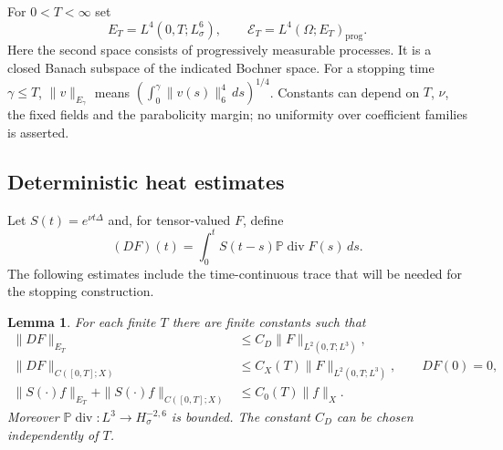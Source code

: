 \documentclass[11pt]{article}
\newcommand{\Pp}{\mathbb P}
\newtheorem{lemma}[theorem]{Lemma}
\numberwithin{equation}{section}
\begin{document}
For $0<T<\infty$ set
\[
 E_T=L^4(0,T;L^6_\sigma),\qquad
 \mathcal E_T=L^4(\Omega;E_T)_{\mathrm{prog}}.
\]
Here the second space consists of progressively measurable processes. It is
a closed Banach subspace of the indicated Bochner space. For a stopping time
$\gamma\leq T$, $\|v\|_{E_\gamma}$ means
$(\int_0^\gamma\|v(s)\|_6^4\,ds)^{1/4}$. Constants can depend on $T$,
$\nu$, the fixed fields and the parabolicity margin; no uniformity over
coefficient families is asserted.

\subsection{Deterministic heat estimates}
Let $S(t)=e^{\nu t\Delta}$ and, for tensor-valued $F$, define
\[
 (DF)(t)=\int_0^tS(t-s)\Pp\operatorname{div}F(s)\,ds.
\]
The following estimates include the time-continuous trace that will be
needed for the stopping construction.

\begin{lemma}\label{lem:heat}
For each finite $T$ there are finite constants such that
\begin{align}
 \|DF\|_{E_T}&\leq C_D\|F\|_{L^2(0,T;L^3)},\label{eq:D-E}\\
 \|DF\|_{C([0,T];X)}&\leq C_X(T)\|F\|_{L^2(0,T;L^3)},
 \qquad DF(0)=0,\label{eq:D-X}\\
 \|S(\cdot)f\|_{E_T}+\|S(\cdot)f\|_{C([0,T];X)}
 &\leq C_0(T)\|f\|_X.\label{eq:initial}
\end{align}
Moreover $\Pp\operatorname{div}:L^3\to H^{-2,6}_\sigma$ is bounded.
The constant $C_D$ can be chosen independently of $T$.
\end{lemma}
\end{document}
